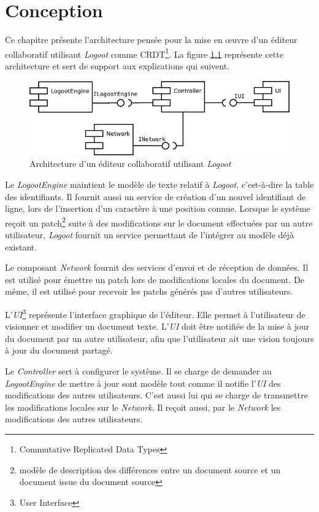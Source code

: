 \chapter{Conception}
  Ce chapitre présente l'architecture pensée pour la mise en \oe{}uvre d'un
  éditeur collaboratif utilisant \emph{Logoot} comme CRDT\footnote{Commutative
  Replicated Data Types}. La figure \ref{fig:architecture} représente cette
  architecture et sert de support aux explications qui suivent.

  \begin{figure}[h]
    \label{fig:architecture}
    \includegraphics[width=\textwidth]{includes/architecture.png}
    \caption{Architecture d'un éditeur collaboratif utilisant \emph{Logoot}}
  \end{figure}

  Le \emph{LogootEngine} maintient le modèle de texte relatif à \emph{Logoot},
  c'est-à-dire la table des identifiants. Il fournit aussi un service de
  création d'un nouvel identifiant de ligne, lors de l'insertion d'un caractère
  à une position connue. Lorsque le système reçoit un patch\footnote{modèle de
  description des différences entre un document source et un document issue du
  document source} suite à des modifications sur le document effectuées par un
  autre utilisateur, \emph{Logoot} fournit un service permettant de l'intégrer
  au modèle déjà existant.

  Le composant \emph{Network} fournit des services d'envoi et de réception de
  données. Il est utilisé pour émettre un patch lors de modifications locales
  du document. De même, il est utilisé pour recevoir les patchs générés pas
  d'autres utilisateurs.

  L'\emph{UI}\footnote{User Interface} représente l'interface graphique de
  l'éditeur. Elle permet à l'utilisateur de visionner et modifier un document
  texte. L'\emph{UI} doit être notifiée de la mise à jour du document par un
  autre utilisateur, afin que l'utilisateur ait une vision toujours à jour
  du document partagé.

  Le \emph{Controller} sert à configurer le système. Il se charge de demander
  au \emph{LogootEngine} de mettre à jour sont modèle tout comme il notifie
  l'\emph{UI} des modifications des autres utilisateurs. C'est aussi lui qui se
  charge de transmettre les modifications locales sur le \emph{Network}. Il
  reçoit aussi, par le \emph{Network} les modifications des autres utilisateurs.

